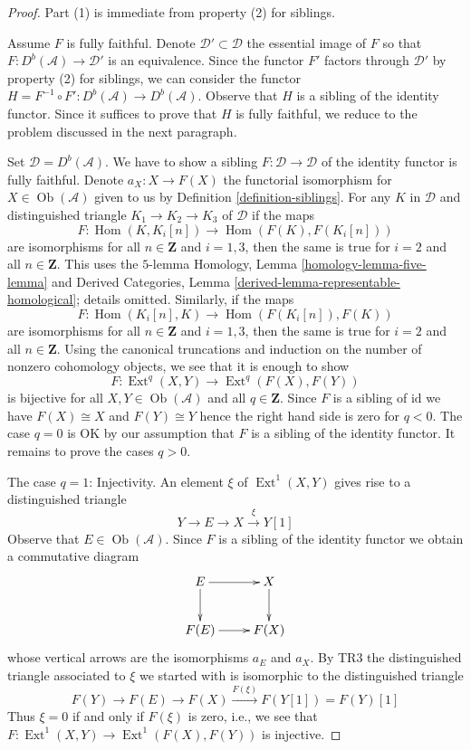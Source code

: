 \documentclass{stacks-project}
\theoremstyle{plain}
\theoremstyle{definition}
\theoremstyle{remark}
\numberwithin{equation}{subsection}
\def\Hom{\mathop{\mathrm{Hom}}\nolimits}
\def\Ext{\mathop{\mathrm{Ext}}\nolimits}
\def\Ob{\mathop{\mathrm{Ob}}\nolimits}
\begin{document}
\begin{proof}
Part (1) is immediate from property (2) for siblings.

\medskip\noindent
Assume $F$ is fully faithful. Denote $\mathcal{D}' \subset \mathcal{D}$
the essential image of $F$ so that $F : D^b(\mathcal{A}) \to \mathcal{D}'$
is an equivalence. Since the functor $F'$ factors through $\mathcal{D}'$
by property (2) for siblings, we can consider the functor
$H = F^{-1} \circ F' : D^b(\mathcal{A}) \to D^b(\mathcal{A})$.
Observe that $H$ is a sibling of the identity functor.
Since it suffices to prove that $H$ is fully faithful,
we reduce to the problem discussed in the next paragraph.

\medskip\noindent
Set $\mathcal{D} = D^b(\mathcal{A})$. We have to show a sibling
$F : \mathcal{D} \to \mathcal{D}$ of the identity functor is fully faithful.
Denote $a_X : X \to F(X)$ the functorial isomorphism for
$X \in \Ob(\mathcal{A})$ given to us by Definition \ref{definition-siblings}.
For any $K$ in $\mathcal{D}$ and distinguished triangle
$K_1 \to K_2 \to K_3$ of $\mathcal{D}$
if the maps
$$
F : \Hom(K, K_i[n]) \to \Hom(F(K), F(K_i[n]))
$$
are isomorphisms for all $n \in \mathbf{Z}$ and $i = 1, 3$, then the
same is true for $i = 2$ and all $n \in \mathbf{Z}$. This uses the
$5$-lemma Homology, Lemma \ref{homology-lemma-five-lemma} and
Derived Categories, Lemma \ref{derived-lemma-representable-homological};
details omitted. Similarly, if the maps
$$
F : \Hom(K_i[n], K) \to \Hom(F(K_i[n]), F(K))
$$
are isomorphisms for all $n \in \mathbf{Z}$ and $i = 1, 3$, then the
same is true for $i = 2$ and all $n \in \mathbf{Z}$. Using the canonical
truncations and induction on the number of nonzero cohomology objects,
we see that it is enough to show
$$
F : \Ext^q(X, Y) \to \Ext^q(F(X), F(Y))
$$
is bijective for all $X, Y \in \Ob(\mathcal{A})$ and all $q \in \mathbf{Z}$.
Since $F$ is a sibling of $\text{id}$ we have $F(X) \cong X$ and
$F(Y) \cong Y$ hence the right hand side is zero for $q < 0$.
The case $q = 0$ is OK by our assumption that $F$ is a sibling of
the identity functor. It remains to prove the cases $q > 0$.

\medskip\noindent
The case $q = 1$: Injectivity. An element $\xi$ of $\Ext^1(X, Y)$
gives rise to a distinguished triangle
$$
Y \to E \to X \xrightarrow{\xi} Y[1]
$$
Observe that $E \in \Ob(\mathcal{A})$. Since $F$ is a sibling of the
identity functor we obtain a commutative diagram
$$
\xymatrix{
E \ar[d] \ar[r] & X \ar[d] \\
F(E) \ar[r] & F(X)
}
$$
whose vertical arrows are the isomorphisms $a_E$ and $a_X$.
By TR3 the distinguished triangle associated to $\xi$ we started
with is isomorphic to the distinguished triangle
$$
F(Y) \to F(E) \to F(X) \xrightarrow{F(\xi)} F(Y[1]) = F(Y)[1]
$$
Thus $\xi = 0$ if and only if $F(\xi)$ is zero, i.e., we see that
$F : \Ext^1(X, Y) \to \Ext^1(F(X), F(Y))$ is injective.


\end{proof}
\end{document}
